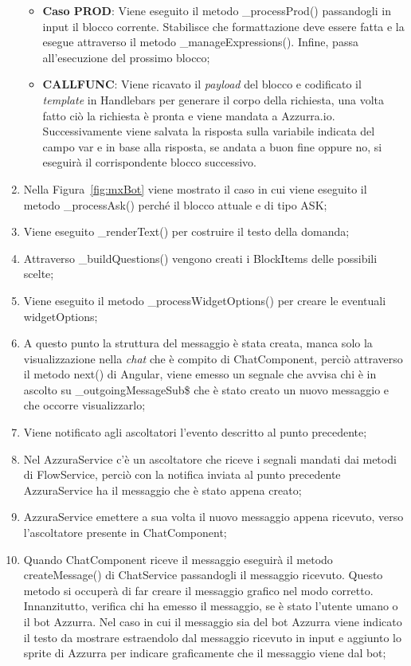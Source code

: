 \begin{enumerate}
\begin{itemize}
		\item \textbf{Caso PROD}: Viene eseguito il metodo \_processProd() passandogli in input il blocco corrente. Stabilisce che formattazione deve essere fatta e la esegue attraverso il metodo \_manageExpressions(). Infine, passa all'esecuzione del prossimo blocco;
		\item \textbf{CALLFUNC}: Viene ricavato il \emph{payload} del blocco e codificato il \emph{template} in Handlebars per generare il corpo della richiesta, una volta fatto ciò la richiesta è pronta e viene mandata a Azzurra.io. Successivamente viene salvata la risposta sulla variabile indicata del campo var e in base alla risposta, se andata a buon fine oppure no, si eseguirà il corrispondente blocco successivo.
	\end{itemize}	
	\item Nella Figura~\ref{fig:mxBot} viene mostrato il caso in cui viene eseguito il metodo \_processAsk() perché il blocco attuale e di tipo ASK;
	\item Viene eseguito \_renderText() per costruire il testo della domanda;
	\item Attraverso \_buildQuestions() vengono creati i BlockItems delle possibili scelte;
	\item Viene eseguito il metodo \_processWidgetOptions() per creare le eventuali widgetOptions;
	\item A questo punto la struttura del messaggio è stata creata, manca solo la visualizzazione nella \emph{chat} che è compito di ChatComponent, perciò attraverso il metodo next() di Angular, viene emesso un segnale che avvisa chi è in ascolto su \_outgoingMessageSub\$ che è stato creato un nuovo messaggio e che occorre visualizzarlo;
	\item Viene notificato agli ascoltatori l'evento descritto al punto precedente;
	\item Nel AzzuraService c'è un ascoltatore che riceve i segnali mandati dai metodi di FlowService, perciò con la notifica inviata al punto precedente AzzuraService ha il messaggio che è stato appena creato;
	\item AzzuraService emettere a sua volta il nuovo messaggio appena ricevuto, verso l'ascoltatore presente in ChatComponent;
	\item Quando ChatComponent riceve il messaggio eseguirà il metodo createMessage() di ChatService passandogli il messaggio ricevuto. Questo metodo si occuperà di far creare il messaggio grafico nel modo corretto.
	Innanzitutto, verifica chi ha emesso il messaggio, se è stato l'utente umano o il \gls{bot}\ap{[g]} Azzurra. Nel caso in cui il messaggio sia del \gls{bot}\ap{[g]} Azzurra viene indicato il testo da mostrare estraendolo dal messaggio ricevuto in input e aggiunto lo sprite di Azzurra per indicare graficamente che il messaggio viene dal bot;

\end{enumerate}
